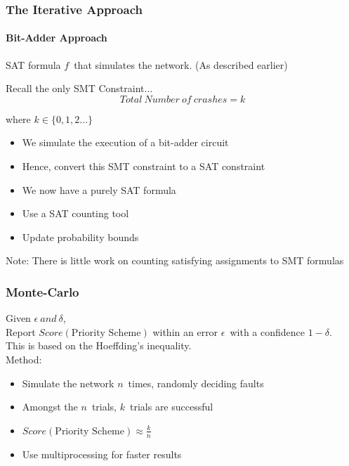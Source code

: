 \documentclass{beamer}
\begin{document}
\begin{frame}
\frametitle{The Iterative Approach}
\framesubtitle{Bit-Adder Approach}
	SAT formula $ f $\ that simulates the network. (As described earlier)\\[1ex]
	\begin{block}{Recall the only SMT Constraint...}
	$$Total\ Number\ of\ crashes = k$$
	\begin{flushright}
		where $k\in\{0,1,2...\}$
	\end{flushright}
	\end{block}

	\pause

	\begin{itemize}
	\item We simulate the execution of a bit-adder circuit
	\item Hence, convert this SMT constraint to a SAT constraint
	\item We now have a purely SAT formula
	\item Use a SAT counting tool
	\item Update probability bounds
	\end{itemize}
	Note: There is little work on counting satisfying assignments to SMT formulas
\end{frame}

\begin{frame}
\frametitle{Monte-Carlo}
	Given $\epsilon \ and\ \delta$,\\
	Report $Score(\text{Priority Scheme})$ within an error $\epsilon$\ with a confidence $1-\delta$.\\[2ex]
	This is based on the Hoeffding's inequality.\\[2ex]
	Method:
	\begin{itemize}
	\item Simulate the network $n$\ times, randomly deciding faults
	\item Amongst the $n$\ trials, $k$\ trials are successful
	\item $Score(\text{Priority Scheme}) \approx \frac{k}{n}$
	\item Use multiprocessing for faster results
	\end{itemize}
\end{frame}
\end{document}

